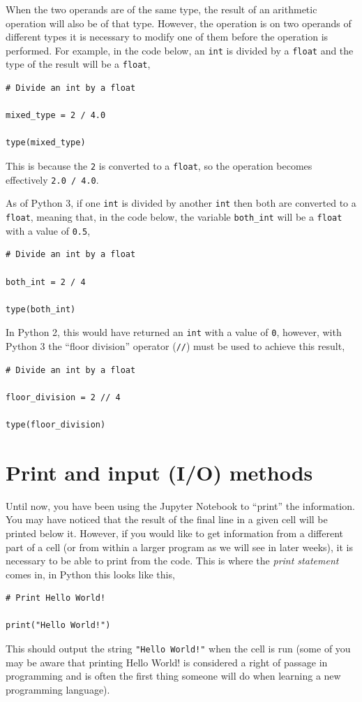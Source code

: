 \documentclass[a4paper]{article}
\begin{document}
When the two operands are of the same type, the result of an arithmetic operation will also be of that type. 
However, the operation is on two operands of different types it is necessary to modify one of them before the operation is performed. 
For example, in the code below, an \texttt{int} is divided by a \texttt{float} and the type of the result will be a \texttt{float}, 
\begin{lstlisting}
# Divide an int by a float 

mixed_type = 2 / 4.0

type(mixed_type)
\end{lstlisting}
This is because the \texttt{2} is converted to a \texttt{float}, so the operation becomes effectively \texttt{2.0 / 4.0}. 

As of Python 3, if one \texttt{int} is divided by another \texttt{int} then both are converted to a \texttt{float}, meaning that, in the code below, the variable \texttt{both\_int} will be a \texttt{float} with a value of \texttt{0.5}, 
\begin{lstlisting}
# Divide an int by a float 

both_int = 2 / 4

type(both_int)
\end{lstlisting}
In Python 2, this would have returned an \texttt{int} with a value of \texttt{0}, however, with Python 3 the ``floor division'' operator (\texttt{//}) must be used to achieve this result,
\begin{lstlisting}
# Divide an int by a float 

floor_division = 2 // 4

type(floor_division)
\end{lstlisting}

\section{Print and input (I/O) methods}

Until now, you have been using the Jupyter Notebook to ``print'' the information. 
You may have noticed that the result of the final line in a given cell will be printed below it. 
However, if you would like to get information from a different part of a cell (or from within a larger program as we will see in later weeks), it is necessary to be able to print from the code. 
This is where the \emph{print statement} comes in, in Python this looks like this, 
\begin{lstlisting}
# Print Hello World!

print("Hello World!")
\end{lstlisting}
This should output the string \texttt{"Hello World!"} when the cell is run (some of you may be aware that printing Hello World! is considered a right of passage in programming and is often the first thing someone will do when learning a new programming language). 
\end{document}
